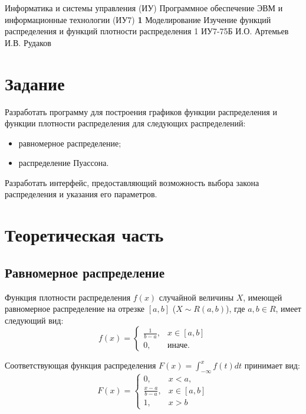 \documentclass{bmstu}
\begin{document}
\makereporttitle
{Информатика и системы управления (ИУ)}
{Программное обеспечение ЭВМ и информационные технологии (ИУ7)}
{\textbf{1}}
{Моделирование}
{Изучение функций распределения и функций плотности распределения}
{1}
{ИУ7-75Б}
{И.О. Артемьев}
{И.В. Рудаков}

\setcounter{page}{2}
\renewcommand{\contentsname}{СОДЕРЖАНИЕ} 
\tableofcontents

\chapter{Задание}
Разработать программу для построения графиков функции распределения и функции плотности распределения для следующих распределений: 
\begin{itemize}
	\item равномерное распределение;
	\item распределение Пуассона.
\end{itemize} 

Разработать интерфейс, предоставляющий возможность выбора закона распределения и указания его параметров.

\chapter{Теоретическая часть}

\section{Равномерное распределение}

Функция плотности распределения $f(x)$ случайной величины $X$, имеющей равномерное распределение на отрезке $[a, b]$ ($X \sim R(a, b)$), где $a, b \in R$, имеет следующий вид:
\begin{equation}
	f(x)=\begin{cases}
		\frac{1}{b - a}, & x \in [a, b] \\
		0, & \text{иначе}.
	\end{cases}
\end{equation}

Соответствующая функция распределения $F(x) = \int_{-\infty}^{x}f(t)dt$ принимает вид: 
\begin{equation}
	F(x)=\begin{cases}
		0, & x < a, \\
		\frac{x - a}{b - a}, & x \in [a, b] \\
		1, & x > b
	\end{cases}
\end{equation}
\end{document}
